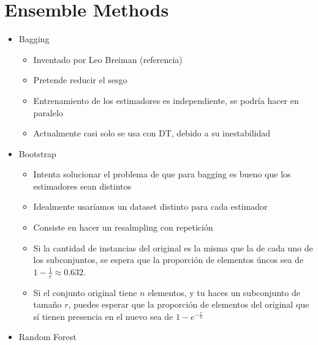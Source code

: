 \section{Ensemble Methods}
    \begin{note}
      \begin{itemize}
        \item Bagging
        \begin{itemize}
          \item Inventado por Leo Breiman (referencia)
          \item Pretende reducir el sesgo
          \item Entrenamiento de los estimadores es independiente, se podría
          hacer en paralelo
          \item Actualmente casi solo se usa con DT, debido a su inestabilidad
        \end{itemize}
        \item Bootstrap
        \begin{itemize}
          \item Intenta solucionar el problema de que para bagging es bueno
          que los estimadores sean distintos
          \item Idealmente usaríamos un dataset distinto para cada estimador
          \item Consiste en hacer un resalmpling con repetición
          \item Si la cantidad de instancias del original es la misma que la de cada uno
          de los subconjuntos, se espera que la proporción de elementos úncos sea de
          $1 - \frac{1}{e} \approx 0.632$.
          \item Si el conjunto original tiene $n$ elementos, y tu haces un subconjunto
          de tamaño $r$, puedes esperar que la proporción de elementos del original que
          sí tienen presencia en el nuevo sea de $1 - e^{-\frac{r}{n}}$
        \end{itemize}
        \item Random Forest
      \end{itemize}
    \end{note}

